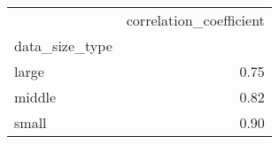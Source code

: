\begin{tabular}{lr}
\toprule
{} &  correlation\_coefficient \\
data\_size\_type &                          \\
\midrule
large          &                     0.75 \\
middle         &                     0.82 \\
small          &                     0.90 \\
\bottomrule
\end{tabular}
